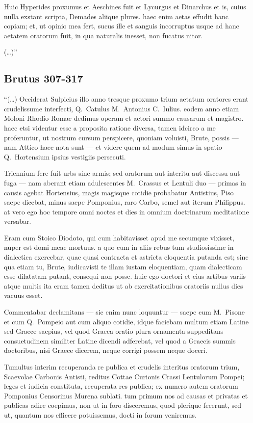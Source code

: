 Huic Hyperides proxumus et Aeschines fuit et Lycurgus et Dinarchus et is, cuius nulla exstant scripta, Demades aliique plures. haec enim aetas effudit hanc copiam; et, ut opinio mea fert, sucus ille et sanguis incorruptus usque ad hanc aetatem oratorum fuit, in qua naturalis inesset, non fucatus nitor.

(\dots)''

\subsection*{Brutus 307-317}

``(\dots) Occiderat Sulpicius illo anno tresque proxumo trium aetatum oratores erant crudelissume interfecti, Q.~Catulus M.~Antonius C.~Iulius. eodem anno etiam Moloni Rhodio Romae dedimus operam et actori summo causarum et magistro. haec etsi videntur esse a proposita ratione diversa, tamen idcirco a me proferuntur, ut nostrum cursum perspicere, quoniam voluisti, Brute, possis — nam Attico haec nota sunt — et videre quem ad modum simus in spatio Q.~Hortensium ipsius vestigiis persecuti.

Triennium fere fuit urbs sine armis; sed oratorum aut interitu aut discessu aut fuga — nam aberant etiam adulescentes M.~Crassus et Lentuli duo — primas in causis agebat Hortensius, magis magisque cotidie probabatur Antistius, Piso saepe dicebat, minus saepe Pomponius, raro Carbo, semel aut iterum Philippus. at vero ego hoc tempore omni noctes et dies in omnium doctrinarum meditatione versabar.

Eram cum Stoico Diodoto, qui cum habitavisset apud me secumque vixisset, nuper est domi meae mortuus. a quo cum in aliis rebus tum studiosissime in dialectica exercebar, quae quasi contracta et astricta eloquentia putanda est; sine qua etiam tu, Brute, iudicavisti te illam iustam eloquentiam, quam dialecticam esse dilatatam putant, consequi non posse. huic ego doctori et eius artibus variis atque multis ita eram tamen deditus ut ab exercitationibus oratoriis nullus dies vacuus esset.

Commentabar declamitans — sic enim nunc loquuntur — saepe cum M.~Pisone et cum Q.~Pompeio aut cum aliquo cotidie, idque faciebam multum etiam Latine sed Graece saepius, vel quod Graeca oratio plura ornamenta suppeditans consuetudinem similiter Latine dicendi adferebat, vel quod a Graecis summis doctoribus, nisi Graece dicerem, neque corrigi possem neque doceri.

Tumultus interim recuperanda re publica et crudelis interitus oratorum trium, Scaevolae Carbonis Antisti, reditus Cottae Curionis Crassi Lentulorum Pompei; leges et iudicia constituta, recuperata res publica; ex numero autem oratorum Pomponius Censorinus Murena sublati. tum primum nos ad causas et privatas et publicas adire coepimus, non ut in foro disceremus, quod plerique fecerunt, sed ut, quantum nos efficere potuissemus, docti in forum veniremus.

